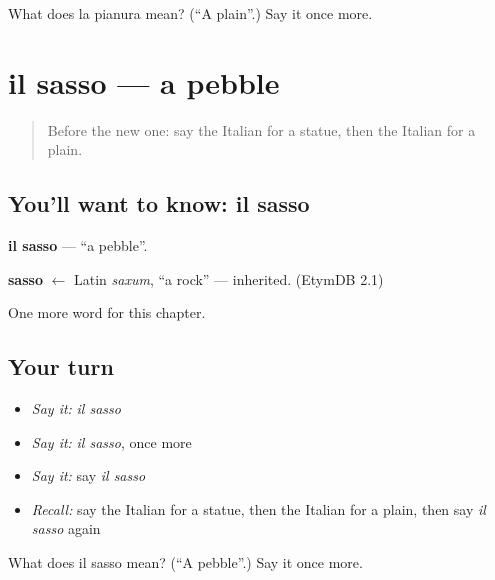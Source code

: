\begin{tcolorbox}[breakable,colback=teal!4,colframe=teal!35!black,title={Before you move on}]
What does la pianura mean? (\textquotedblleft{}A plain\textquotedblright{}.) Say it once more.
\end{tcolorbox}
\section[il sasso]{il sasso — a pebble}

\label{lesson:IT-C229-sasso}



\begin{quote}
Before the new one: say the Italian for a statue, then the Italian for a plain.
\end{quote}

\subsection*{You'll want to know: il sasso}
\textbf{il sasso} — \textquotedblleft{}a pebble\textquotedblright{}.

\begin{cousinweb}
\textbf{sasso} $\leftarrow$ Latin \emph{saxum}, \textquotedblleft{}a rock\textquotedblright{} — inherited. (EtymDB 2.1)
\end{cousinweb}

\begin{grammarlens}[title={What you've built}]
One more word for this chapter.
\end{grammarlens}

\subsection*{Your turn}
\begin{itemize}
\raggedright
  \item \emph{Say it:} \emph{il sasso}
  \item \emph{Say it:} \emph{il sasso}, once more
  \item \emph{Say it:} say \emph{il sasso}
  \item \emph{Recall:} say the Italian for a statue, then the Italian for a plain, then say \emph{il sasso} again
\end{itemize}

\begin{tcolorbox}[breakable,colback=teal!4,colframe=teal!35!black,title={Before you move on}]
What does il sasso mean? (\textquotedblleft{}A pebble\textquotedblright{}.) Say it once more.
\end{tcolorbox}
